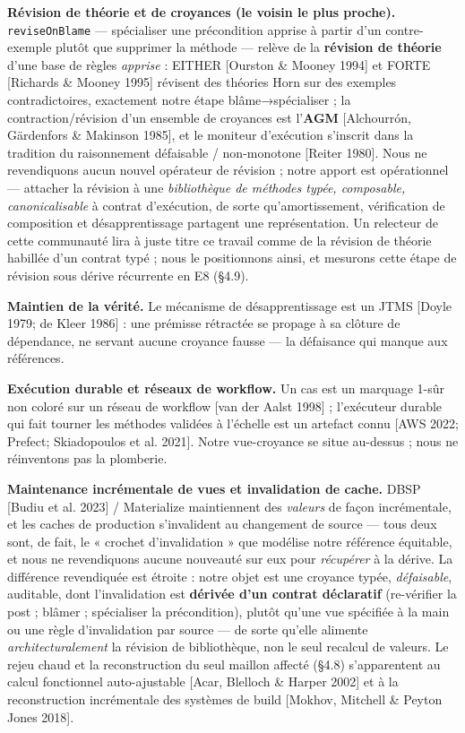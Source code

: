 \documentclass[11pt]{article}
\begin{document}
\textbf{Révision de théorie et de croyances (le voisin le plus proche).} \texttt{reviseOnBlame} — spécialiser une précondition apprise à partir d'un contre-exemple plutôt que supprimer la méthode — relève de la \textbf{révision de théorie} d'une base de règles \emph{apprise} : EITHER [Ourston \& Mooney 1994] et FORTE [Richards \& Mooney 1995] révisent des théories Horn sur des exemples contradictoires, exactement notre étape blâme→spécialiser ; la contraction/révision d'un ensemble de croyances est l'\textbf{AGM} [Alchourrón, Gärdenfors \& Makinson 1985], et le moniteur d'exécution s'inscrit dans la tradition du raisonnement défaisable / non-monotone [Reiter 1980]. Nous ne revendiquons aucun nouvel opérateur de révision ; notre apport est opérationnel — attacher la révision à une \emph{bibliothèque de méthodes typée, composable, canonicalisable} à contrat d'exécution, de sorte qu'amortissement, vérification de composition et désapprentissage partagent une représentation. Un relecteur de cette communauté lira à juste titre ce travail comme de la révision de théorie habillée d'un contrat typé ; nous le positionnons ainsi, et mesurons cette étape de révision sous dérive récurrente en E8 (§4.9).

\textbf{Maintien de la vérité.} Le mécanisme de désapprentissage est un JTMS [Doyle 1979; de Kleer 1986] : une prémisse rétractée se propage à sa clôture de dépendance, ne servant aucune croyance fausse — la défaisance qui manque aux références.

\textbf{Exécution durable et réseaux de workflow.} Un cas est un marquage 1-sûr non coloré sur un réseau de workflow [van der Aalst 1998] ; l'exécuteur durable qui fait tourner les méthodes validées à l'échelle est un artefact connu [AWS 2022; Prefect; Skiadopoulos et al. 2021]. Notre vue-croyance se situe au-dessus ; nous ne réinventons pas la plomberie.

\textbf{Maintenance incrémentale de vues et invalidation de cache.} DBSP [Budiu et al. 2023] / Materialize maintiennent des \emph{valeurs} de façon incrémentale, et les caches de production s'invalident au changement de source — tous deux sont, de fait, le « crochet d'invalidation » que modélise notre référence équitable, et nous ne revendiquons aucune nouveauté sur eux pour \emph{récupérer} à la dérive. La différence revendiquée est étroite : notre objet est une croyance typée, \emph{défaisable}, auditable, dont l'invalidation est \textbf{dérivée d'un contrat déclaratif} (re-vérifier la post ; blâmer ; spécialiser la précondition), plutôt qu'une vue spécifiée à la main ou une règle d'invalidation par source — de sorte qu'elle alimente \emph{architecturalement} la révision de bibliothèque, non le seul recalcul de valeurs. Le rejeu chaud et la reconstruction du seul maillon affecté (§4.8) s'apparentent au calcul fonctionnel auto-ajustable [Acar, Blelloch \& Harper 2002] et à la reconstruction incrémentale des systèmes de build [Mokhov, Mitchell \& Peyton Jones 2018].
\end{document}
